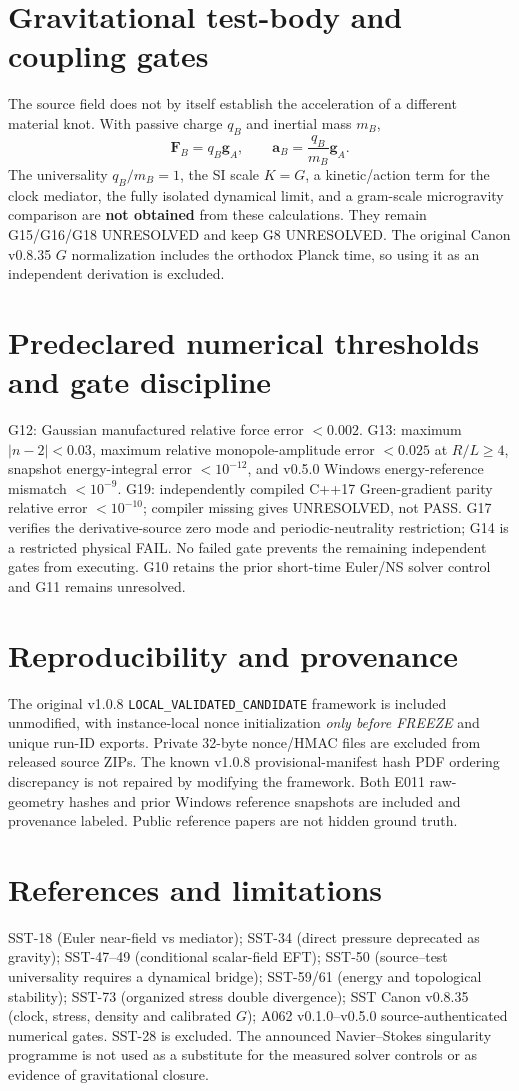 \documentclass[10pt,a4paper]{article}
\begin{document}
\section{Gravitational test-body and coupling gates}
The source field does not by itself establish the acceleration of a different material knot. With passive charge $q_B$ and inertial mass $m_B$,
\begin{equation}
\mathbf F_B=q_B\mathbf g_A,\qquad\mathbf a_B=\frac{q_B}{m_B}\mathbf g_A.
\end{equation}
The universality $q_B/m_B=1$, the SI scale $K=G$, a kinetic/action term for the clock mediator, the fully isolated dynamical limit, and a gram-scale microgravity comparison are \textbf{not obtained} from these calculations. They remain G15/G16/G18 UNRESOLVED and keep G8 UNRESOLVED. The original Canon v0.8.35 $G$ normalization includes the orthodox Planck time, so using it as an independent derivation is excluded.
\section{Predeclared numerical thresholds and gate discipline}
G12: Gaussian manufactured relative force error $<0.002$. G13: maximum $|n-2|<0.03$, maximum relative monopole-amplitude error $<0.025$ at $R/L\ge4$, snapshot energy-integral error $<10^{-12}$, and v0.5.0 Windows energy-reference mismatch $<10^{-9}$. G19: independently compiled C++17 Green-gradient parity relative error $<10^{-10}$; compiler missing gives UNRESOLVED, not PASS. G17 verifies the derivative-source zero mode and periodic-neutrality restriction; G14 is a restricted physical FAIL. No failed gate prevents the remaining independent gates from executing. G10 retains the prior short-time Euler/NS solver control and G11 remains unresolved.
\section{Reproducibility and provenance}
The original v1.0.8 \texttt{LOCAL\_VALIDATED\_CANDIDATE} framework is included unmodified, with instance-local nonce initialization \emph{only before FREEZE} and unique run-ID exports. Private 32-byte nonce/HMAC files are excluded from released source ZIPs. The known v1.0.8 provisional-manifest hash PDF ordering discrepancy is not repaired by modifying the framework. Both E011 raw-geometry hashes and prior Windows reference snapshots are included and provenance labeled. Public reference papers are not hidden ground truth.
\section{References and limitations}
SST-18 (Euler near-field vs mediator); SST-34 (direct pressure deprecated as gravity); SST-47--49 (conditional scalar-field EFT); SST-50 (source--test universality requires a dynamical bridge); SST-59/61 (energy and topological stability); SST-73 (organized stress double divergence); SST Canon v0.8.35 (clock, stress, density and calibrated $G$); A062 v0.1.0--v0.5.0 source-authenticated numerical gates. SST-28 is excluded. The announced Navier--Stokes singularity programme is not used as a substitute for the measured solver controls or as evidence of gravitational closure.
\end{document}
